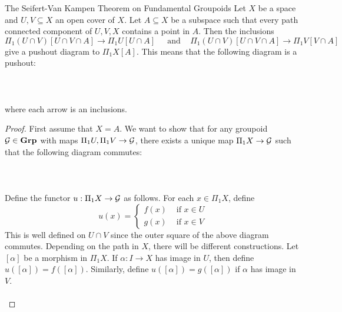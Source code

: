 \documentclass[a4paper]{article}
\begin{document}
\begin{thm}{The Seifert-Van Kampen Theorem on Fundamental Groupoids}{} Let $X$ be a space and $U,V\subseteq X$ an open cover of $X$. Let $A\subseteq X$ be a subspace such that every path connected component of $U,V,X$ contains a point in $A$. Then the inclusions $$\Pi_1(U\cap V)[U\cap V\cap A]\to\Pi_1U[U\cap A]\;\;\;\;\text{ and }\;\;\;\Pi_1(U\cap V)[U\cap V\cap A]\to\Pi_1V[V\cap A]$$ give a pushout diagram to $\Pi_1X[A]$. This means that the following diagram is a pushout: \\~\\
 \\~\\
where each arrow is an inclusions. 
\tcbline
\begin{proof}
First assume that $X=A$. We want to show that for any groupoid $\mathcal{G}\in\bold{Grp}$ with maps $\Pi_1U,\Pi_1V\to\mathcal{G}$, there exists a unique map $\Pi_1X\to\mathcal{G}$ such that the following diagram commutes: \\~\\
\\~\\
Define the functor $u:\Pi_1X\to\mathcal{G}$ as follows. For each $x\in\Pi_1X$, define $$u(x)=\begin{cases}
f(x) & \text{ if }x\in U\\
g(x) & \text{ if }x\in V
\end{cases}$$ This is well defined on $U\cap V$ since the outer square of the above diagram commutes. Depending on the path in $X$, there will be different constructions. Let $[\alpha]$ be a morphism in $\Pi_1X$. If $\alpha:I\to X$ has image in $U$, then define $u([\alpha])=f([\alpha])$. Similarly, define $u([\alpha])=g([\alpha])$ if $\alpha$ has image in $V$. \\~\\


\end{proof}
\end{thm}
\end{document}
